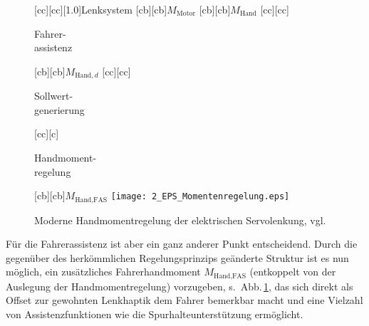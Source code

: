 \begin{figure}[ht]
	[cc][cc][1.0]{Lenksystem}
	[cb][cb]{$M_\text{Motor}$}
	[cb][cb]{$M_\text{Hand}$}
	[cc][cc]{{\parbox[c]{7cm}{\begin{center} Fahrer- \\ assistenz \end{center}}}}
	[cb][cb]{$M_{\text{Hand},d}$}
	[cc][cc]{{\parbox[c]{7cm}{\begin{center} Sollwert- \\ generierung \end{center}}}}
	[cc][c]{{\parbox[c]{7cm}{\begin{center} Handmoment- \\ regelung \end{center}}}}
	[cb][cb]{$M_\text{Hand,FAS}$}
\centering
\texttt{[image: 2\_EPS\_Momentenregelung.eps]}
 \caption[Moderne Handmomentregelung der elektrischen Servolenkung]{Moderne Handmomentregelung der elektrischen Servolenkung, vgl.\ \cite{pfeffer2013lenkungshandbuch}}
 \label{fig:eps_Momentregelung}
\end{figure} 

Für die Fahrerassistenz ist aber ein ganz anderer Punkt entscheidend. Durch die gegenüber des herkömmlichen Regelungsprinzips geänderte Struktur ist es nun möglich,  ein zusätzliches Fahrerhandmoment $M_\text{Hand,FAS}$ (entkoppelt von der Auslegung der Handmomentregelung) vorzugeben, s.\ Abb.\,\ref{fig:eps_Momentregelung}, das sich direkt als Offset zur gewohnten Lenkhaptik dem Fahrer bemerkbar macht und eine Vielzahl von Assistenzfunktionen wie die Spurhalteunterstützung ermöglicht.

